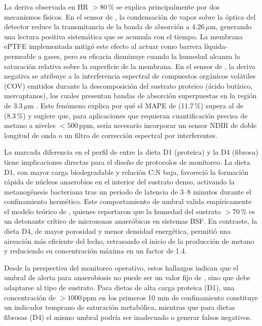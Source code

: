 La deriva observada en HR $> 80$\,\% se explica principalmente por dos
mecanismos físicos. En el sensor de , la condensación de vapor
sobre la óptica del detector reduce la transmitancia de la banda de
absorción a 4.26\,$\mu$m, generando una lectura positiva sistemática
que se acumula con el tiempo. La membrana ePTFE implementada mitigó
este efecto al actuar como barrera líquida-permeable a gases, pero su
eficacia disminuye cuando la humedad alcanza la saturación relativa
sobre la superficie de la membrana. En el sensor de , la deriva
negativa se atribuye a la interferencia espectral de compuestos
orgánicos volátiles (COV) emitidos durante la descomposición del
sustrato proteico (ácido butírico, mercaptanos), los cuales presentan
bandas de absorción superpuestas en la región de 3.3\,$\mu$m
\autocite{chenEffectMoistureContent2019}. Este fenómeno explica por qué
el MAPE de  (11.7\,\%) supera al de  (8.3\,\%) y
sugiere que, para aplicaciones que requieran cuantificación precisa de
metano a niveles $< 500$\,ppm, sería necesario incorporar un sensor NDIR
de doble longitud de onda o un filtro de corrección espectral por
interferentes.

La marcada diferencia en el perfil de  entre la dieta D1
(proteica) y la D4 (fibrosa) tiene implicaciones directas para el
diseño de protocolos de monitoreo. La dieta D1, con mayor carga
biodegradable y relación C:N baja, favoreció la formación rápida de
núcleos anaerobios en el interior del sustrato denso, activando la
metanogénesis bacteriana tras un periodo de latencia de 3--8 minutos
durante el confinamiento hermético. Este comportamiento de umbral
valida empíricamente el modelo teórico de \textcite{bekkerImpactSubstrateMoisture2021a},
quienes reportaron que la humedad del sustrato $> 70$\,\% es un
detonante crítico de microzonas anaeróbicas en sistemas BSF. En
contraste, la dieta D4, de mayor porosidad y menor densidad energética,
permitió una aireación más eficiente del lecho, retrasando el inicio de
la producción de metano y reduciendo su concentración máxima en un
factor de 1.4.

Desde la perspectiva del monitoreo operativo, estos hallazgos indican
que el umbral de alerta para anaerobiosis no puede ser un valor fijo
de , sino que debe adaptarse al tipo de sustrato. Para dietas
de alta carga proteica (D1), una concentración de  $> 1000$\,ppm
en los primeros 10 min de confinamiento constituye un indicador temprano
de saturación metabólica, mientras que para dietas fibrosas (D4) el
mismo umbral podría ser inadecuado o generar falsos negativos.

